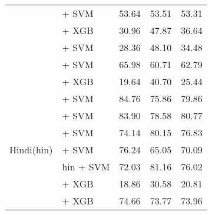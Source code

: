 \begin{longtable}{llccc}
                                          & \citep{sturua2024jinaembeddingsv3multilingualembeddingstask} + SVM & 53.64                                & 53.51              & 53.31             \\
                                          & \citep{sturua2024jinaembeddingsv3multilingualembeddingstask} + XGB & 30.96                                & 47.87              & 36.64             \\
                                          & \citep{oketunji2024pmmlv2finetunedhausa} + SVM                     & 28.36                                & 48.10              & 34.48             \\
                                          & \citep{dobler-demelo-2023-focus} + SVM                             & 65.98                                & 60.71              & 62.79             \\
                                          & \citep{all-MiniLM-L12-v2} + XGB                                    & 19.64                                & 40.70              & 25.44             \\
    \midrule
    \multirow{7}{*}{Hindi(hin)}           & \citep{sukhlecha_2024_bhasha_embed_v0} + SVM                       & 84.76                                & 75.86              & 79.86             \\
                                          & \citep{wang2024multilingual} + SVM                                 & 83.90                                & 78.58              & 80.77             \\
                                          & \citep{joshi2022l3cubemahasbert} + SVM                             & 74.14                                & 80.15              & 76.83             \\
                                          & \citep{nogueira2019documentexpansionqueryprediction} + SVM         & 76.24                                & 65.05              & 70.09             \\
                                          & \citep{feng2020languageagnostic} hin + SVM                         & 72.03                                & 81.16              & 76.02             \\
                                          & \citep{all-MiniLM-L12-v2} + XGB                                    & 18.86                                & 30.58              & 20.81             \\
                                          & \citep{sturua2024jinaembeddingsv3multilingualembeddingstask} + XGB & 74.66                                & 73.77              & 73.96             \\


\end{longtable}

